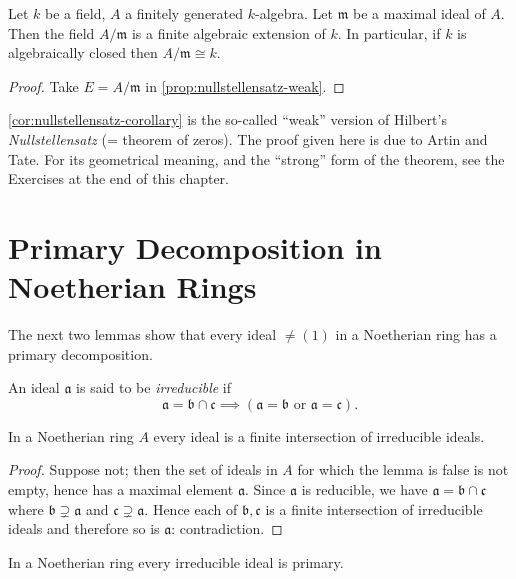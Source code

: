 \begin{corollary}\label{cor:nullstellensatz-corollary}
Let $k$ be a field, $A$ a finitely generated $k$-algebra. Let $\mathfrak{m}$ be a maximal ideal of $A$. Then the field $A/\mathfrak{m}$ is a finite algebraic extension of $k$. In particular, if $k$ is algebraically closed then $A/\mathfrak{m} \cong k$.
\end{corollary}

\begin{proof}
Take $E = A/\mathfrak{m}$ in \eqref{prop:nullstellensatz-weak}.
\end{proof}

\eqref{cor:nullstellensatz-corollary} is the so-called ``weak'' version of Hilbert's \emph{Nullstellensatz} (= theorem of zeros). The proof given here is due to Artin and Tate. For its geometrical meaning, and the ``strong'' form of the theorem, see the Exercises at the end of this chapter.

\section*{Primary Decomposition in Noetherian Rings}

The next two lemmas show that every ideal $\neq (1)$ in a Noetherian ring has a primary decomposition.

An ideal $\mathfrak{a}$ is said to be \emph{irreducible} if
\[
\mathfrak{a} = \mathfrak{b} \cap \mathfrak{c} \implies (\mathfrak{a} = \mathfrak{b} \text{ or } \mathfrak{a} = \mathfrak{c}).
\]

\begin{lemma}\label{lem:finite-intersection-irreducible}
In a Noetherian ring $A$ every ideal is a finite intersection of irreducible ideals.
\end{lemma}

\begin{proof}
Suppose not; then the set of ideals in $A$ for which the lemma is false is not empty, hence has a maximal element $\mathfrak{a}$. Since $\mathfrak{a}$ is reducible, we have $\mathfrak{a} = \mathfrak{b} \cap \mathfrak{c}$ where $\mathfrak{b} \supsetneq \mathfrak{a}$ and $\mathfrak{c} \supsetneq \mathfrak{a}$. Hence each of $\mathfrak{b}, \mathfrak{c}$ is a finite intersection of irreducible ideals and therefore so is $\mathfrak{a}$: contradiction.
\end{proof}

\begin{lemma}\label{lem:irreducible-primary}
In a Noetherian ring every irreducible ideal is primary.
\end{lemma}

